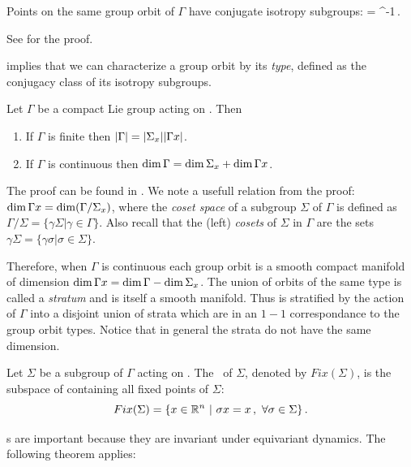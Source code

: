\begin{lemma}
\label{lem:stabGorbit}
Points on the same group orbit of $\Gamma$ have conjugate isotropy subgroups:
\beq
	=\gamma {} \gamma^{-1}\,.
\eeq
\end{lemma}
See  for the proof.

 implies that we can characterize a group orbit by its \emph{type}, defined
as the conjugacy class of its isotropy subgroups.

\begin{proposition}
 Let $\Gamma$ be a compact Lie group acting on . Then
 \begin{enumerate}
  \item If $\Gamma$ is finite then $|\Gamma|=|\Sigma_{x}||\Gamma x|$.
  \item If $\Gamma$ is continuous then $\dim \Gamma = \dim \Sigma_{x}+\dim \Gamma x$.
 \end{enumerate}
\end{proposition}
The proof can be found in . We note a usefull relation from the proof: $\dim\Gamma x =\dim(\Gamma/\Sigma_{x})$, where the \emph{coset space} of a subgroup $\Sigma$  of $\Gamma$ is defined as $\Gamma/\Sigma=\{\gamma\Sigma|\gamma\in\Gamma\}$. Also recall that the (left) \emph{cosets} of $\Sigma$ in $\Gamma$ are the sets $\gamma\Sigma=\{\gamma\sigma|\sigma\in\Sigma\}$.

Therefore, when $\Gamma$ is continuous each group orbit is a smooth compact manifold of dimension
$\dim \Gamma x=\dim \Gamma-\dim \Sigma_{x}$. The union of orbits of the same type is called a \emph{stratum}
and is itself a smooth manifold. Thus  is stratified by the action of $\Gamma$ into
a disjoint union of strata which are in an $1-1$ correspondance to the group orbit types. Notice that in general
the strata do not have the same dimension.

\begin{definition}
 \label{def:fixedsp}
  Let $\Sigma$ be a subgroup of $\Gamma$ acting on . The \fixedsp\ of $\Sigma$, denoted by $Fix(\Sigma)$, is the subspace of  containing all fixed points of $\Sigma$:
\[
	Fix(\Sigma)=\{x\in\mathbb{R}^{n}\ |\ \sigma x = x\,,\ \forall \sigma\in\Sigma\}\,.
\]
\end{definition}

\Fixedsp s are important because they are invariant under equivariant dynamics. The following theorem applies:

